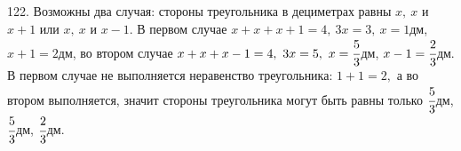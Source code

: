 122. Возможны два случая: стороны треугольника в дециметрах равны $x,\ x$ и $x+1$ или $x,\ x$ и $x-1.$ В первом случае $x+x+x+1=4,\ 3x=3,\ x=1$дм, $x+1=2$дм, во втором случае $x+x+x-1=4,\ 3x=5,\ x=\cfrac{5}{3}$дм, $x-1=\cfrac{2}{3}$дм. В первом случае не выполняется неравенство треугольника: $1+1=2,$ а во втором выполняется, значит стороны треугольника могут быть равны только $\cfrac{5}{3}$дм, $\cfrac{5}{3}$дм, $\cfrac{2}{3}$дм.\\

